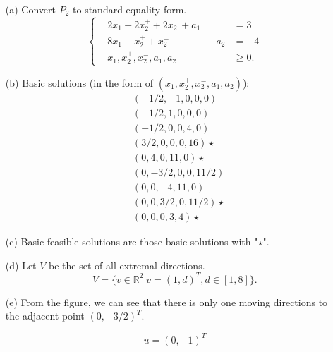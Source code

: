 \documentclass[12pt]{article}
\begin{document}
\FloatBarrier

\begin{enumerate}
\item [(a)]
Convert $P_2$ to standard equality form.
$$
\left\{
\begin{aligned}
& 2x_1 - 2x_2^+ + 2x_2^- + a_1 & & = 3 \\
& 8x_1 - x_2^+ + x_2^-   & -a_2 & = -4 \\
& x_1, x_2^+, x_2^-, a_1, a_2 & & \geqslant 0.
\end{aligned}
\right.
$$

\item[(b)]
Basic solutions (in the form of $(x_1, x_2^+, x_2^-, a_1, a_2)$): 
$$
\begin{aligned}
&(-1/2, -1, 0, 0, 0)   \\ 
&(-1/2, 1, 0, 0, 0) \\ 
&(-1/2, 0, 0, 4, 0) \\
& (3/2, 0, 0, 0, 16) \star \\ 
 &(0, 4, 0, 11, 0) \star \\
 & (0, -3/2, 0, 0, 11/2) \\
 & (0, 0, -4, 11, 0) \\
& (0, 0, 3/2, 0, 11/2) \star \\
& (0, 0, 0, 3, 4) \star
\end{aligned}
$$

\item[(c)]
Basic feasible solutions are those basic solutions with "$\star$".

\item[(d)]
Let $V$ be the set of all extremal directions. 
$$
V = \{v \in\mathbb R^2| v = (1, d)^T, d\in [1, 8] \}.
$$

\item[(e)]
From the figure, we can see that there is only one moving directions to the adjacent point $(0, -3/2)^T$. 

$$
u = (0, -1)^T
$$
\end{enumerate}
\end{document}
